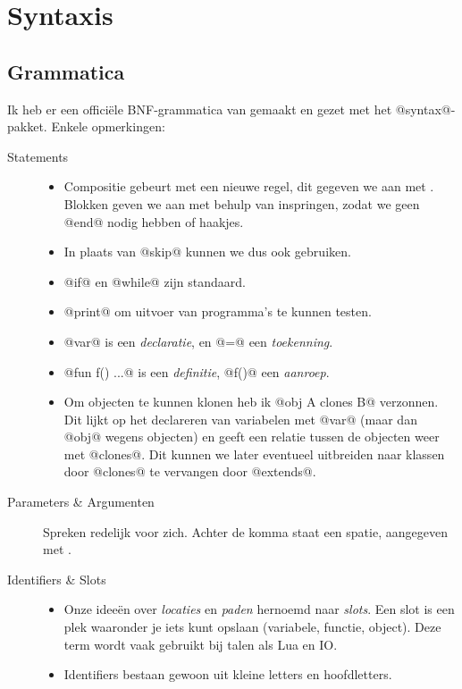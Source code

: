 \chapter{Syntaxis}

\section{Grammatica}

Ik heb er een officiële \textsc{BNF}-grammatica van gemaakt en gezet met het @syntax@-pakket.
Enkele opmerkingen:
\begin{description}
  \item[Statements]
    \begin{itemize}
      \item Compositie gebeurt met een nieuwe regel,
        dit gegeven we aan met \Righttorque.
        Blokken geven we aan met behulp van inspringen,
        zodat we geen @end@ nodig hebben of haakjes.
      \item In plaats van @skip@ kunnen we dus ook \Righttorque gebruiken.
      \item @if@ en @while@ zijn standaard.
      \item @print@ om uitvoer van programma's te kunnen testen.
      \item @var@ is een \emph{declaratie}, en @=@ een \emph{toekenning}.
      \item @fun f() ...@ is een \emph{definitie}, @f()@ een \emph{aanroep}.
      \item Om objecten te kunnen klonen heb ik @obj A clones B@ verzonnen.
        Dit lijkt op het declareren van variabelen met @var@
        (maar dan @obj@ wegens objecten)
        en geeft een relatie tussen de objecten weer met @clones@.
        Dit kunnen we later eventueel uitbreiden naar klassen door
        @clones@ te vervangen door @extends@.
    \end{itemize}
  \item[Parameters \& Argumenten]
    Spreken redelijk voor zich. Achter de komma staat een spatie, aangegeven met \textvisiblespace.
  \item[Identifiers \& Slots]
    \begin{itemize}
      \item Onze ideeën over \emph{locaties} en \emph{paden}
        hernoemd naar \emph{slots}. Een slot is een plek waaronder
        je iets kunt opslaan (variabele, functie, object).
        Deze term wordt vaak gebruikt bij talen als Lua en IO.
      \item Identifiers bestaan gewoon uit kleine letters en hoofdletters.

\end{itemize}
\end{description}
